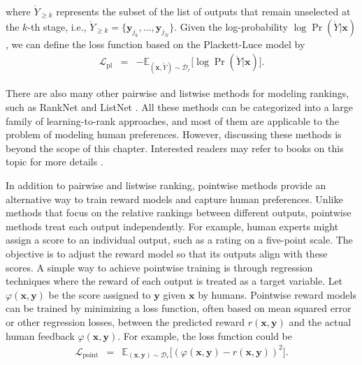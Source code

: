 \noindent where $\mathring{Y}_{\ge k}$ represents the subset of the list of outputs that remain unselected at the $k$-th stage, i.e., $\mathring{Y}_{\ge k} = \{\mathbf{y}_{j_k},...,\mathbf{y}_{j_N}\}$. Given the log-probability $\log \Pr(\mathring{Y} | \mathbf{x})$, we can define the loss function based on the Plackett-Luce model by
\begin{eqnarray}
\mathcal{L}_{\mathrm{pl}} & = & -\mathbb{E}_{(\mathbf{x},\mathring{Y}) \sim \mathcal{D}_r} \big[ \log \Pr(\mathring{Y} | \mathbf{x}) \big].
\end{eqnarray}

There are also many other pairwise and listwise methods for modeling rankings, such as RankNet \cite{burges-etal:2005learning} and ListNet \cite{cao-etal:2007learning}. All these methods can be categorized into a large family of learning-to-rank approaches, and most of them are applicable to the problem of modeling human preferences. However, discussing these methods is beyond the scope of this chapter. Interested readers may refer to books on this topic for more details \cite{liu:2009learning,li2011:learning}.

In addition to pairwise and listwise ranking, pointwise methods provide an alternative way to train reward models and capture human preferences. Unlike methods that focus on the relative rankings between different outputs, pointwise methods treat each output independently. For example, human experts might assign a score to an individual output, such as a rating on a five-point scale. The objective is to adjust the reward model so that its outputs align with these scores. A simple way to achieve pointwise training is through regression techniques where the reward of each output is treated as a target variable. Let $\varphi(\mathbf{x},\mathbf{y})$ be the score assigned to $\mathbf{y}$ given $\mathbf{x}$ by humans. Pointwise reward models can be trained by minimizing a loss function, often based on mean squared error or other regression losses, between the predicted reward $r(\mathbf{x},\mathbf{y})$ and the actual human feedback $\varphi(\mathbf{x},\mathbf{y})$. For example, the loss function could be
\begin{eqnarray}
\mathcal{L}_{\mathrm{point}} & = & \mathbb{E}_{(\mathbf{x},\mathbf{y}) \sim \mathcal{D}_r} \big[ (\varphi(\mathbf{x},\mathbf{y}) - r(\mathbf{x},\mathbf{y}) )^2\big].
\end{eqnarray}


